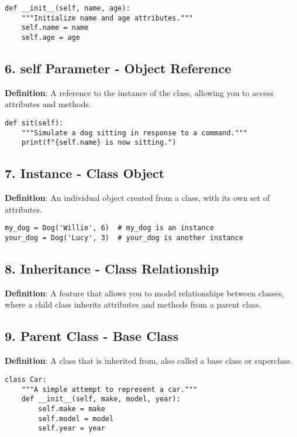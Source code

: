 \begin{lstlisting}
def __init__(self, name, age):
    """Initialize name and age attributes."""
    self.name = name
    self.age = age
\end{lstlisting}

\subsection*{6. self Parameter - Object Reference}
\textbf{Definition}: A reference to the instance of the class, allowing you to access attributes and methods.

\begin{lstlisting}
def sit(self):
    """Simulate a dog sitting in response to a command."""
    print(f"{self.name} is now sitting.")
\end{lstlisting}

\subsection*{7. Instance - Class Object}
\textbf{Definition}: An individual object created from a class, with its own set of attributes.

\begin{lstlisting}
my_dog = Dog('Willie', 6)  # my_dog is an instance
your_dog = Dog('Lucy', 3)  # your_dog is another instance
\end{lstlisting}

\subsection*{8. Inheritance - Class Relationship}
\textbf{Definition}: A feature that allows you to model relationships between classes, where a child class inherits attributes and methods from a parent class.



\subsection*{9. Parent Class - Base Class}
\textbf{Definition}: A class that is inherited from, also called a base class or superclass.

\begin{lstlisting}
class Car:
    """A simple attempt to represent a car."""
    def __init__(self, make, model, year):
        self.make = make
        self.model = model
        self.year = year
\end{lstlisting}

